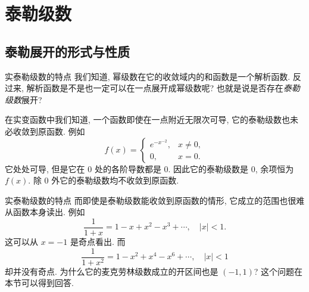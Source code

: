\section{泰勒级数}

\subsection{泰勒展开的形式与性质}

\begin{frame}{实泰勒级数的特点}
	\onslide<+->
	我们知道, 幂级数在它的收敛域内的和函数是一个解析函数.
	\onslide<+->
	反过来, 解析函数是不是也一定可以在一点展开成幂级数呢? 也就是说是否存在\emph{泰勒级数}展开?

	\onslide<+->
	在实变函数中我们知道, 一个函数即使在一点附近无限次可导, 它的泰勒级数也未必收敛到原函数.
	\onslide<+->
	例如
	\[f(x)=\begin{cases}
	e^{-x^{-2}},&x\neq 0,\\
	0,&x=0.\end{cases}\]
	\onslide<+->
	它处处可导, 但是它在 $0$ 处的各阶导数都是 $0$.
	\onslide<+->
	因此它的泰勒级数是 $0$, 余项恒为 $f(x)$.
	\onslide<+->
	除 $0$ 外它的泰勒级数均不收敛到原函数.
\end{frame}


\begin{frame}{实泰勒级数的特点}
	\onslide<+->
	而即使是泰勒级数能收敛到原函数的情形, 它成立的范围也很难从函数本身读出.
	\onslide<+->
	例如
	\[\dfrac1{1+x}=1-x+x^2-x^3+\cdots,\quad|x|<1.\]
	\onslide<+->
	这可以从 $x=-1$ 是奇点看出.
	\onslide<+->
	而
	\[\dfrac1{1+x^2}=1-x^2+x^4-x^6+\cdots,\quad|x|<1\]
	却并没有奇点.
	\onslide<+->
	为什么它的麦克劳林级数成立的开区间也是 $(-1,1)$?
	\onslide<+->
	这个问题在本节可以得到回答.
\end{frame}


